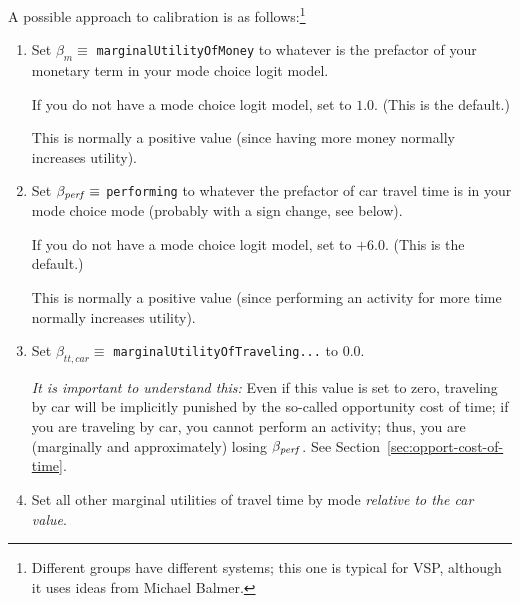 A possible approach to calibration is as follows:\footnote{%
%
Different groups have different systems; this one is typical for VSP, although it uses ideas from Michael Balmer.
%
}
\begin{enumerate}



\item Set $\beta_{m} \equiv$ \verb$marginalUtilityOfMoney$ to whatever is the prefactor of your monetary term in your mode choice logit model.

If you do not have a mode choice logit model, set to $1.0$.  (This is the default.)

This is normally a positive value (since having more money normally increases utility).

\item Set $\beta_{\it perf} \equiv$ \verb$performing$ to whatever the prefactor of car travel time is in your mode choice mode (probably with a sign change, see below).

If you do not have a mode choice logit model, set to $+6.0$.  (This is the default.)

This is normally a positive value (since performing an activity for more time normally increases utility).

\item Set $\beta_{tt,car} \equiv$ \verb$marginalUtilityOfTraveling...$ to $0.0$. 

\emph{It is important to understand this:}  Even if this value is set to zero, traveling by car will be implicitly punished by the so-called opportunity cost of time; if you are traveling by car, you cannot perform an activity; thus, you are (marginally and approximately) losing $\beta_{\it perf}$.  See Section~\ref{sec:opport-cost-of-time}.

\item Set all other marginal utilities of travel time by mode \emph{relative to the car value}.


\end{enumerate}
